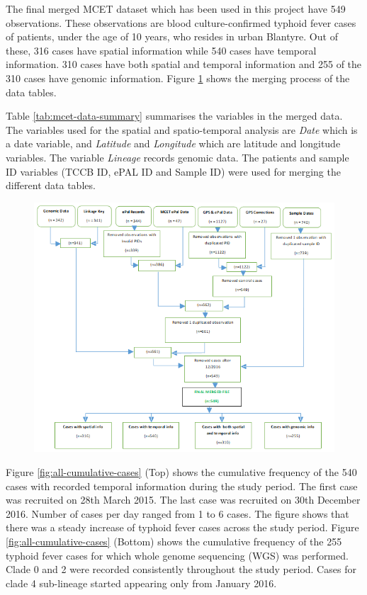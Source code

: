 The final merged MCET dataset which has been used in this project have 549 observations.
These observations are blood culture-confirmed typhoid fever cases of patients, under the age of 10 years, who resides in urban Blantyre.
Out of these, 316 cases have spatial information while 540 cases have temporal information.
310 cases have both spatial and temporal information and 255 of the 310 cases have genomic information.
Figure \ref{fig:flow-diagram} shows the merging process of the data tables.

Table \ref{tab:mcet-data-summary} summarises the variables in the merged data.
The variables used for the spatial and spatio-temporal analysis are \textit{Date} which is a date variable, and \textit{Latitude} and \textit{Longitude} which are latitude and longitude variables.
The variable \textit{Lineage} records genomic data.
The patients and sample ID variables (TCCB ID, ePAL ID and Sample ID) were used for merging the different data tables.

\begin{figure}[H]
    \includegraphics[scale=0.85]{MCET_Project_Data_Merging_Flow_Diagram.png}
     \label{fig:flow-diagram}
\end{figure}

Figure \ref{fig:all-cumulative-cases} (Top) shows the cumulative frequency of the 540 cases with recorded temporal information during the study period.
The first case was recruited on 28th March 2015.
The last case was recruited on 30th December 2016.
Number of cases per day ranged from 1 to 6 cases.
The figure shows that there was a steady increase of typhoid fever cases across the study period.
Figure \ref{fig:all-cumulative-cases} (Bottom) shows the cumulative frequency of the 255 typhoid fever cases for which whole genome sequencing (WGS) was performed.
Clade 0 and 2 were recorded consistently throughout the study period.
Cases for clade 4 sub-lineage started appearing only from January 2016.

